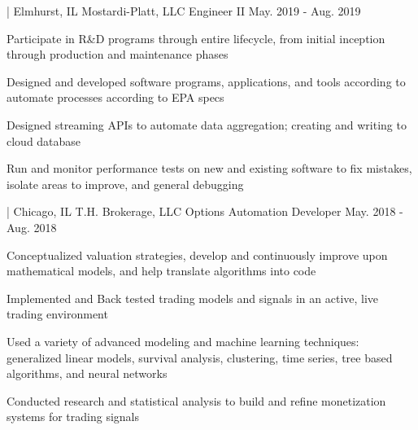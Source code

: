 

\begin{cventries}


 \cventry
    {|  Elmhurst, IL} %
    { Mostardi-Platt, LLC} %
    {Engineer II} %
    {May. 2019 - Aug. 2019} %
    {
      \begin{cvitems} %
        \item {Participate in R\&D programs through entire lifecycle, from initial inception through production and maintenance phases}
        \item {Designed and developed software programs, applications, and tools according to automate processes according to EPA specs}
        \item {Designed streaming APIs to automate data aggregation; creating and writing to cloud database}
        \item {Run and monitor performance tests on new and existing software to fix mistakes, isolate areas to improve, and general debugging}
      \end{cvitems}
    }
    

  \cventry
    {|  Chicago, IL} %
    { T.H. Brokerage, LLC} %
    {Options Automation Developer} %
    {May. 2018 - Aug. 2018} %
    {
      \begin{cvitems} %
        \item {Conceptualized valuation strategies, develop and continuously improve upon mathematical models, and help translate algorithms into code}
        \item {Implemented and Back tested trading models and signals in an active, live trading environment}
        \item {Used a variety of advanced modeling and machine learning techniques: generalized linear models, survival analysis, clustering, time series, tree based algorithms, and neural networks}
        \item {Conducted research and statistical analysis to build and refine monetization systems for trading signals}
      \end{cvitems}
    }

\end{cventries}
